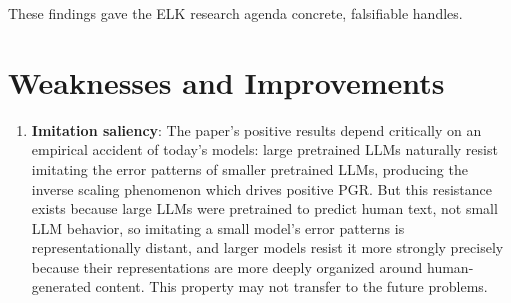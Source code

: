 \documentclass{article}
\begin{document}
\begin{enumerate}[leftmargin=*]
These findings gave the ELK research agenda concrete, falsifiable handles.

\section{Weaknesses and Improvements}

\begin{enumerate}[leftmargin=*]

 \item \textbf{Imitation saliency}: The paper's positive results depend critically on an empirical accident of today's models: large pretrained LLMs naturally resist imitating the error patterns of smaller pretrained LLMs, producing the inverse scaling phenomenon which drives positive PGR. But this resistance exists because large LLMs were pretrained to predict human text, not small LLM behavior, so imitating a small model's error patterns is representationally distant, and larger models resist it more strongly precisely because their representations are more deeply organized around human-generated content. This property may not transfer to the future problems.



\end{enumerate}
\end{enumerate}
\end{document}
